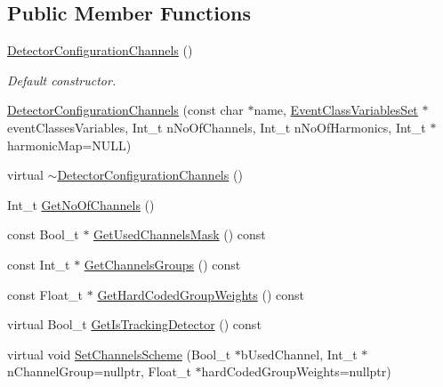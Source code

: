 \subsection*{Public Member Functions}
\begin{DoxyCompactItemize}
\item 
\mbox{\label{classQn_1_1DetectorConfigurationChannels_a4db2660fe522de2dc67222f7c3900662}} 
\mbox{\hyperlink{classQn_1_1DetectorConfigurationChannels_a4db2660fe522de2dc67222f7c3900662}{Detector\+Configuration\+Channels}} ()
\begin{DoxyCompactList}\small\item\em Default constructor. \end{DoxyCompactList}\item 
\mbox{\hyperlink{classQn_1_1DetectorConfigurationChannels_a317ef35a90228d567c1ba612476e6730}{Detector\+Configuration\+Channels}} (const char $\ast$name, \mbox{\hyperlink{classQn_1_1EventClassVariablesSet}{Event\+Class\+Variables\+Set}} $\ast$event\+Classes\+Variables, Int\+\_\+t n\+No\+Of\+Channels, Int\+\_\+t n\+No\+Of\+Harmonics, Int\+\_\+t $\ast$harmonic\+Map=N\+U\+LL)
\item 
virtual \mbox{\hyperlink{classQn_1_1DetectorConfigurationChannels_aeb451a1ee7e9444dde635d2bb11dafd3}{$\sim$\+Detector\+Configuration\+Channels}} ()
\item 
Int\+\_\+t \mbox{\hyperlink{classQn_1_1DetectorConfigurationChannels_a7d31f3204016bbb12099911649c29840}{Get\+No\+Of\+Channels}} ()
\item 
const Bool\+\_\+t $\ast$ \mbox{\hyperlink{classQn_1_1DetectorConfigurationChannels_a541ac77e7e2e15690eed089a66d0c5a1}{Get\+Used\+Channels\+Mask}} () const
\item 
const Int\+\_\+t $\ast$ \mbox{\hyperlink{classQn_1_1DetectorConfigurationChannels_a393356a54937b18706b49b3e6748674f}{Get\+Channels\+Groups}} () const
\item 
const Float\+\_\+t $\ast$ \mbox{\hyperlink{classQn_1_1DetectorConfigurationChannels_a7de674ab1e919b85391215c18db325ca}{Get\+Hard\+Coded\+Group\+Weights}} () const
\item 
virtual Bool\+\_\+t \mbox{\hyperlink{classQn_1_1DetectorConfigurationChannels_a24728cc5b3b9f80f9965268d1153f06c}{Get\+Is\+Tracking\+Detector}} () const
\item 
virtual void \mbox{\hyperlink{classQn_1_1DetectorConfigurationChannels_a920171069e4f5e36e0849cc5ac3c9a3d}{Set\+Channels\+Scheme}} (Bool\+\_\+t $\ast$b\+Used\+Channel, Int\+\_\+t $\ast$n\+Channel\+Group=nullptr, Float\+\_\+t $\ast$hard\+Coded\+Group\+Weights=nullptr)

\end{DoxyCompactItemize}
